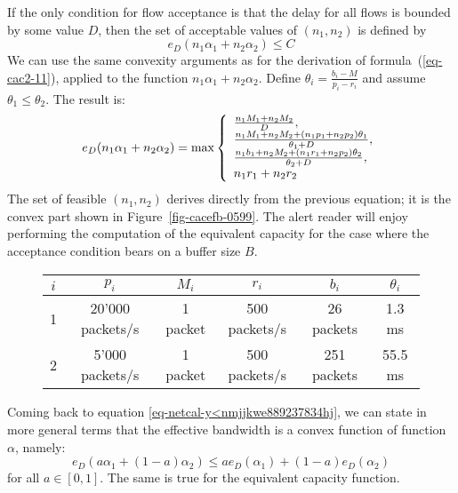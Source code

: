 If the only condition for flow acceptance is that the delay for
all flows is bounded by some value $D$, then the set of acceptable
values of $(n_1, n_2)$ is defined by
 $$
 e_D(n_1 \alpha_1+ n_2 \alpha_2) \leq C
 $$
We can use the same convexity arguments as for the derivation of
formula~(\ref{eq-cac2-11}), applied to the function $n_1 \alpha_1+
n_2 \alpha_2$. Define $\theta_i=\frac{b_i-M}{p_i-r_i}$ and assume
$\theta_1 \leq \theta_2$. The result is:
 $$
   e_D(n_1 \alpha_1+ n_2 \alpha_2) = \max \left\{\begin{array}{l} 
   \frac{n_1 M_1+n_2 M_2}{D},\\
   \frac{n_1 M_1+n_2 M_2 + (n_1 p_1 + n_2 p_2)\theta_1}{\theta_1 +
   D},\\
   \frac{n_1 b_1 +n_2 M_2 + (n_1 r_1 + n_2 p_2)\theta_2}{\theta_2 +
   D},\\
   n_1 r_1 +n_2 r_2
    \end{array} \right.
 $$
The set of feasible $(n_1, n_2)$ derives directly from the
previous equation; it is the convex part shown in
Figure~\ref{fig-cacefb-0599}. The alert reader will enjoy
performing the computation of the equivalent capacity for the case
where the acceptance condition bears on a buffer size $B$.
\begin{figure}[!htbp]
\begin{center}
 \begin{tabular}{|c|c|c|c|c|c|}
        \hline
        $i$ &  $p_{i}$ & $M_i$ & $r_{i}$ & $b_{i}$ & $\theta_{i}$  \\
        \hline
        \hline
        1 & 20'000 packets/s & 1 packet & 500 packets/s & 26 packets & 1.3 ms  \\
        \hline
         2 & 5'000 packets/s & 1 packet & 500 packets/s & 251 packets & 55.5 ms \\
        \hline
    \end{tabular}
\end{center}
\end{figure}

Coming back to equation \ref{eq-netcal-y<nmjjkwe889237834hj}, we
can state in more general terms that the effective bandwidth is a
convex function of function $\alpha$, namely:
$$ e_{D}(a\alpha_{1} + (1-a) \alpha_{2}) \leq
a e_{D}(\alpha_{1}) + (1-a) e_{D}(\alpha_{2}) $$ for all $a \in
[0,1]$. The same is true for the equivalent capacity function.


